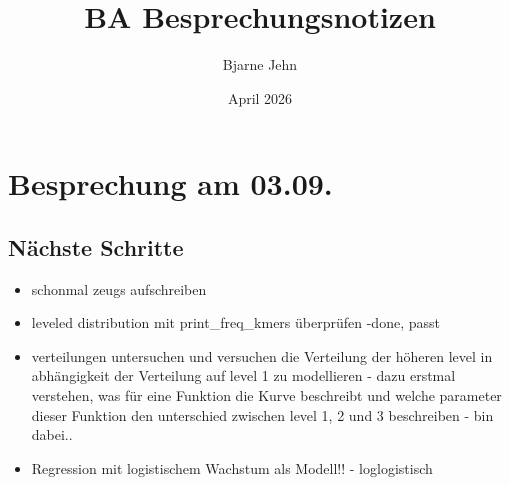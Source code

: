 \documentclass{article}
\title{BA Besprechungsnotizen}
\author{Bjarne Jehn}
\date{April 2026}
\begin{document}
	
\maketitle

\maketitle
\section*{Besprechung am 03.09.}
\subsection*{Nächste Schritte}
\begin{itemize}
	\item schonmal zeugs aufschreiben
	\item leveled distribution mit print\_freq\_kmers überprüfen -done, passt
	\item verteilungen untersuchen und versuchen die Verteilung der höheren level in abhängigkeit der Verteilung auf level 1 zu modellieren - dazu erstmal verstehen, was für eine Funktion die Kurve beschreibt und welche parameter dieser Funktion den unterschied zwischen level 1, 2 und 3 beschreiben - bin dabei..
	\item Regression mit logistischem Wachstum als Modell!! - loglogistisch
\end{itemize}
\end{document}
